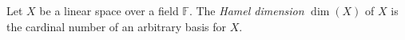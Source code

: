 Let $X$ be a linear space over a field $\mathbb{F}$. The \emph{Hamel dimension} $\dim(X)$ of $X$ is the cardinal number of an arbitrary basis for $X$.
